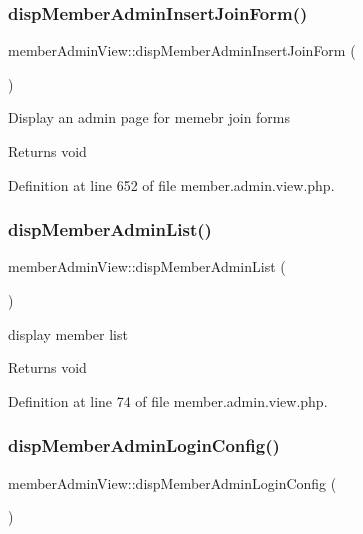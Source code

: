 \subsubsection{\texorpdfstring{disp\+Member\+Admin\+Insert\+Join\+Form()}{dispMemberAdminInsertJoinForm()}}
{\footnotesize\ttfamily member\+Admin\+View\+::disp\+Member\+Admin\+Insert\+Join\+Form (\begin{DoxyParamCaption}{ }\end{DoxyParamCaption})}

Display an admin page for memebr join forms

\begin{DoxyReturn}{Returns}
void 
\end{DoxyReturn}


Definition at line 652 of file member.\+admin.\+view.\+php.

\mbox{\label{classmemberAdminView_ab234e23e8317000c0f1722ab0f54ab99}} 
\subsubsection{\texorpdfstring{disp\+Member\+Admin\+List()}{dispMemberAdminList()}}
{\footnotesize\ttfamily member\+Admin\+View\+::disp\+Member\+Admin\+List (\begin{DoxyParamCaption}{ }\end{DoxyParamCaption})}

display member list

\begin{DoxyReturn}{Returns}
void 
\end{DoxyReturn}


Definition at line 74 of file member.\+admin.\+view.\+php.

\mbox{\label{classmemberAdminView_a98debda6b76587e3633453e68c58a955}} 
\subsubsection{\texorpdfstring{disp\+Member\+Admin\+Login\+Config()}{dispMemberAdminLoginConfig()}}
{\footnotesize\ttfamily member\+Admin\+View\+::disp\+Member\+Admin\+Login\+Config (\begin{DoxyParamCaption}{ }\end{DoxyParamCaption})}



